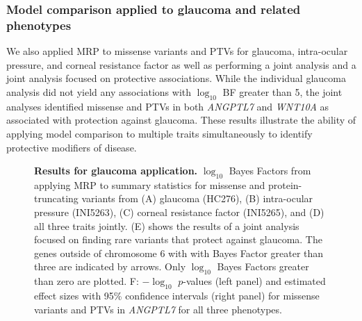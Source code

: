 \subsubsection*{Model comparison applied to glaucoma and related phenotypes}
We also applied MRP to missense variants and PTVs for glaucoma, intra-ocular pressure, and corneal resistance factor as well as performing a joint analysis and a joint analysis focused on protective associations. While the individual glaucoma analysis did not yield any associations with $\log_{10}$ BF greater than 5, the joint analyses identified missense and PTVs in both \textit{ANGPTL7} and \textit{WNT10A} as associated with protection against glaucoma. These results illustrate the ability of applying model comparison to multiple traits simultaneously to identify protective modifiers of disease. 

\begin{figure}[!h]
\caption{{\bf Results for glaucoma application.}
$\log_{10}$ Bayes Factors from applying MRP to summary statistics for missense and protein-truncating variants from (A) glaucoma (HC276), (B) intra-ocular pressure (INI5263), (C) corneal resistance factor (INI5265), and (D) all three traits jointly. (E) shows the results of a joint analysis focused on finding rare variants that protect against glaucoma. The genes outside of chromosome 6 with with Bayes Factor greater than three are indicated by arrows. Only $\log_{10}$ Bayes Factors greater than zero are plotted. F: $-\log_{10}$ $p$-values (left panel) and estimated effect sizes with 95\% confidence intervals (right panel) for missense variants and PTVs in \textit{ANGPTL7} for all three phenotypes.}
\label{fig4}
\end{figure}

